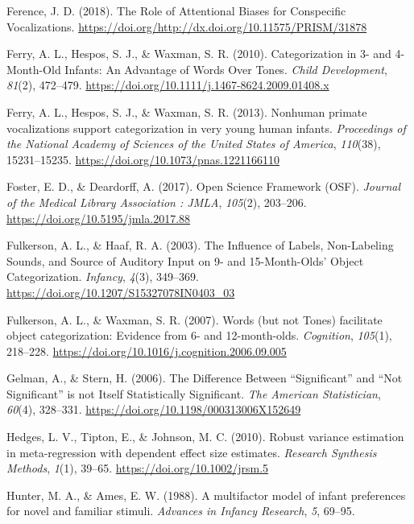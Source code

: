 \documentclass[
  english,
  man]{apa6}
\begin{document}
\leavevmode\hypertarget{ref-ference_role_2018}{}%
Ference, J. D. (2018). The Role of Attentional Biases for Conspecific Vocalizations. \url{https://doi.org/http://dx.doi.org/10.11575/PRISM/31878}

\leavevmode\hypertarget{ref-ferry_categorization_2010}{}%
Ferry, A. L., Hespos, S. J., \& Waxman, S. R. (2010). Categorization in 3- and 4-Month-Old Infants: An Advantage of Words Over Tones. \emph{Child Development}, \emph{81}(2), 472--479. \url{https://doi.org/10.1111/j.1467-8624.2009.01408.x}

\leavevmode\hypertarget{ref-ferry_nonhuman_2013}{}%
Ferry, A. L., Hespos, S. J., \& Waxman, S. R. (2013). Nonhuman primate vocalizations support categorization in very young human infants. \emph{Proceedings of the National Academy of Sciences of the United States of America}, \emph{110}(38), 15231--15235. \url{https://doi.org/10.1073/pnas.1221166110}

\leavevmode\hypertarget{ref-foster_open_2017}{}%
Foster, E. D., \& Deardorff, A. (2017). Open Science Framework (OSF). \emph{Journal of the Medical Library Association : JMLA}, \emph{105}(2), 203--206. \url{https://doi.org/10.5195/jmla.2017.88}

\leavevmode\hypertarget{ref-fulkerson_influence_2003}{}%
Fulkerson, A. L., \& Haaf, R. A. (2003). The Influence of Labels, Non-Labeling Sounds, and Source of Auditory Input on 9- and 15-Month-Olds' Object Categorization. \emph{Infancy}, \emph{4}(3), 349--369. \url{https://doi.org/10.1207/S15327078IN0403_03}

\leavevmode\hypertarget{ref-fulkerson_words_2007}{}%
Fulkerson, A. L., \& Waxman, S. R. (2007). Words (but not Tones) facilitate object categorization: Evidence from 6- and 12-month-olds. \emph{Cognition}, \emph{105}(1), 218--228. \url{https://doi.org/10.1016/j.cognition.2006.09.005}

\leavevmode\hypertarget{ref-gelman_difference_2006}{}%
Gelman, A., \& Stern, H. (2006). The Difference Between ``Significant'' and ``Not Significant'' is not Itself Statistically Significant. \emph{The American Statistician}, \emph{60}(4), 328--331. \url{https://doi.org/10.1198/000313006X152649}

\leavevmode\hypertarget{ref-hedges_robust_2010}{}%
Hedges, L. V., Tipton, E., \& Johnson, M. C. (2010). Robust variance estimation in meta-regression with dependent effect size estimates. \emph{Research Synthesis Methods}, \emph{1}(1), 39--65. \url{https://doi.org/10.1002/jrsm.5}

\leavevmode\hypertarget{ref-hunter_multifactor_1988}{}%
Hunter, M. A., \& Ames, E. W. (1988). A multifactor model of infant preferences for novel and familiar stimuli. \emph{Advances in Infancy Research}, \emph{5}, 69--95.
\end{document}
